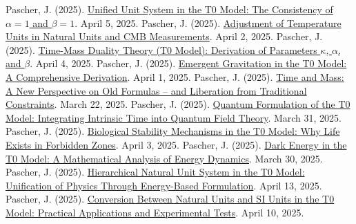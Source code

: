\documentclass[12pt,a4paper]{article}
\begin{document}
\begin{thebibliography}{99}
		 Pascher, J. (2025). \href{https://github.com/jpascher/T0-Time-Mass-Duality/tree/main/2/pdf/English/Alpha1Beta1KonsistenzEn.pdf}{Unified Unit System in the T0 Model: The Consistency of \(\alpha = 1\) and \(\beta = 1\)}. April 5, 2025.
		 Pascher, J. (2025). \href{https://github.com/jpascher/T0-Time-Mass-Duality/tree/main/2/pdf/English/TempEinheitenCMBEn.pdf}{Adjustment of Temperature Units in Natural Units and CMB Measurements}. April 2, 2025.
		 Pascher, J. (2025). \href{https://github.com/jpascher/T0-Time-Mass-Duality/tree/main/2/pdf/English/ZeitMasseT0ParamsEn.pdf}{Time-Mass Duality Theory (T0 Model): Derivation of Parameters \(\kappa\), \(\alpha\), and \(\beta\)}. April 4, 2025.
		 Pascher, J. (2025). \href{https://github.com/jpascher/T0-Time-Mass-Duality/tree/main/2/pdf/English/EmergentGravT0En.pdf}{Emergent Gravitation in the T0 Model: A Comprehensive Derivation}. April 1, 2025.
		 Pascher, J. (2025). \href{https://github.com/jpascher/T0-Time-Mass-Duality/tree/main/2/pdf/English/ZeitMasseNeuerBlickEn.pdf}{Time and Mass: A New Perspective on Old Formulas – and Liberation from Traditional Constraints}. March 22, 2025.
		 Pascher, J. (2025). \href{https://github.com/jpascher/T0-Time-Mass-Duality/tree/main/2/pdf/English/QuantumFormulationT0En.pdf}{Quantum Formulation of the T0 Model: Integrating Intrinsic Time into Quantum Field Theory}. March 31, 2025.
		 Pascher, J. (2025). \href{https://github.com/jpascher/T0-Time-Mass-Duality/tree/main/2/pdf/English/BioStabilityT0En.pdf}{Biological Stability Mechanisms in the T0 Model: Why Life Exists in Forbidden Zones}. April 3, 2025.
		 Pascher, J. (2025). \href{https://github.com/jpascher/T0-Time-Mass-Duality/tree/main/2/pdf/English/MathEnergiedynamikEn.pdf}{Dark Energy in the T0 Model: A Mathematical Analysis of Energy Dynamics}. March 30, 2025.
		 Pascher, J. (2025). \href{https://github.com/jpascher/T0-Time-Mass-Duality/tree/main/2/pdf/English/NatEinheitenSystematikEn.pdf}{Hierarchical Natural Unit System in the T0 Model: Unification of Physics Through Energy-Based Formulation}. April 13, 2025.
		 Pascher, J. (2025). \href{https://github.com/jpascher/T0-Time-Mass-Duality/tree/main/2/pdf/English/NatEinheitenKonversionEn.pdf}{Conversion Between Natural Units and SI Units in the T0 Model: Practical Applications and Experimental Tests}. April 10, 2025.
		

\end{thebibliography}
\end{document}
